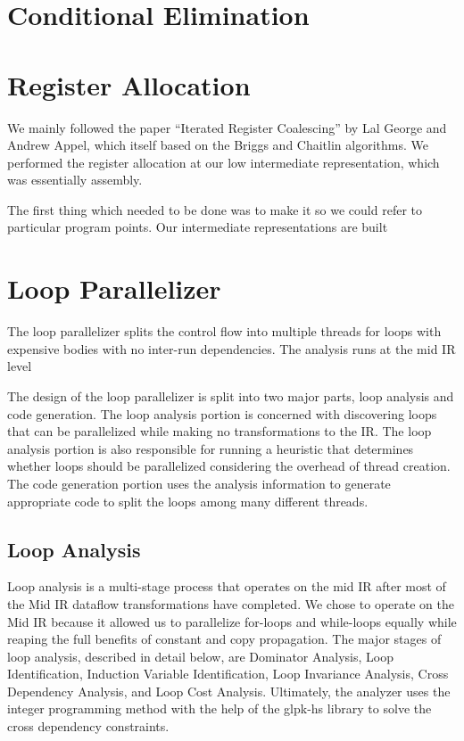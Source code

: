 \documentclass[11pt]{article}
\begin{document}

\section {Conditional Elimination} 


\section {Register Allocation}

We mainly followed the paper ``Iterated Register Coalescing'' by Lal
George and Andrew Appel, which itself based on the Briggs and Chaitlin
algorithms.  We performed the register allocation at our low
intermediate representation, which was essentially assembly.

The first thing which needed to be done was to make it so we could
refer to particular program points.  Our intermediate representations
are built 

\section{Loop Parallelizer}

The loop parallelizer splits the control flow into multiple threads
for loops with expensive bodies with no inter-run dependencies. The
analysis runs at the mid IR level 

The design of the loop parallelizer is split into two major parts,
loop analysis and code generation. The loop analysis portion is
concerned with discovering loops that can be parallelized while making
no transformations to the IR. The loop analysis portion is also
responsible for running a heuristic that determines whether loops
should be parallelized considering the overhead of thread
creation. The code generation portion uses the analysis information to 
generate appropriate code to split the loops among many different
threads.

\subsection { Loop Analysis } 

Loop analysis is a multi-stage process that operates on the mid IR
after most of the Mid IR dataflow transformations have completed. We
chose to operate on the Mid IR because it allowed us to parallelize
for-loops and while-loops equally while reaping the full benefits of
constant and copy propagation. The major stages of loop analysis,
described in detail below, are Dominator Analysis, Loop
Identification, Induction Variable Identification, Loop Invariance
Analysis, Cross Dependency Analysis, and Loop Cost
Analysis. Ultimately, the analyzer uses the integer programming method
with the help of the glpk-hs library to solve the cross dependency
constraints.
\end{document}
